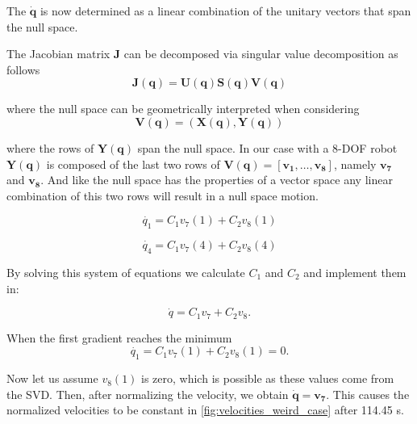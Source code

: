 The $\dot{\mathbf{q}}$ is now determined as a linear combination of the unitary vectors that span the null space.


The Jacobian matrix $\mathbf{J}$ can be decomposed via singular value decomposition \cite{svd} as follows
\begin{equation}
\mathbf{J}(\mathbf{q})=\mathbf{U}(\mathbf{q}) \mathbf{S}(\mathbf{q}) \mathbf{V}(\mathbf{q})
\label{eq:svd}
\end{equation}

where the null space can be geometrically interpreted when considering 
\begin{equation}
\mathbf{V}(\mathbf{q})=(\mathbf{X}(\mathbf{q}),\mathbf{Y}(\mathbf{q}))
\label{eq:4.32Dietrich}
\end{equation}

where the rows of $\mathbf{Y}(\mathbf{q})$ span the null space. In our case with a 8-DOF robot $\mathbf{Y}(\mathbf{q})$  is composed of the last two rows of $\mathbf{V}(\mathbf{q}) = [ \mathbf{v_1}, \dots , \mathbf{v_8}]$, namely $\mathbf{v_7}$ and $\mathbf{v_8}$. And like the null space has the properties of a vector space any linear combination of this two rows will result in a null space motion. 

\begin{equation}
\dot{q_1}  = C_1 v_7(1) + C_2 v_8(1) 
\label{eq:}
\end{equation}

\begin{equation}
\dot{q_4} = C_1 v_7(4) + C_2 v_8(4)
\label{eq:}
\end{equation}



By solving this system of equations we calculate $C_1$ and $C_2$ and implement them in:

\begin{equation}
\dot{q} = C_1 v_7 + C_2 v_8 .
\label{eq:}
\end{equation}

When the first gradient reaches the minimum \begin{equation}
\dot{q_1}  = C_1 v_7(1) + C_2 v_8(1) = 0 .
\label{eq:}
\end{equation}

Now let us assume  $v_8(1)$ is zero, which is possible as these values come from the SVD. Then, after normalizing the velocity, we obtain $\mathbf{\dot{q} =v_7 }$. This causes the normalized velocities to be constant in  \ref{fig:velocities_weird_case} after 114.45 s.


